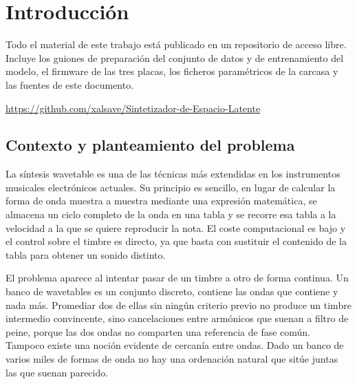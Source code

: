 \chapter{Introducción}

\noindent\begin{minipage}[c]{0.76\textwidth}
Todo el material de este trabajo está publicado en un repositorio de acceso
libre. Incluye los guiones de preparación del conjunto de datos y de
entrenamiento del modelo, el firmware de las tres placas, los ficheros
paramétricos de la carcasa y las fuentes de este documento.

\smallskip
\noindent\url{https://github.com/xalsave/Sintetizador-de-Espacio-Latente}
\end{minipage}\hfill
\begin{minipage}[c]{0.20\textwidth}
\centering
{}
\end{minipage}

\bigskip

\section{Contexto y planteamiento del problema}
\hypertarget{RE1.1}{}\label{RE1.1}

La síntesis wavetable es una de las técnicas más extendidas en los instrumentos
musicales electrónicos actuales. Su principio es sencillo, en lugar de calcular
la forma de onda muestra a muestra mediante una expresión matemática, se
almacena un ciclo completo de la onda en una tabla y se recorre esa tabla a la
velocidad a la que se quiere reproducir la nota. El coste
computacional es bajo y el control sobre el timbre es directo, ya que basta con
sustituir el contenido de la tabla para obtener un sonido distinto.

El problema aparece al intentar pasar de un timbre a otro de forma continua. Un
banco de wavetables es un conjunto discreto, contiene las ondas que contiene y
nada más. Promediar dos de ellas sin ningún criterio previo no produce un timbre
intermedio convincente, sino cancelaciones entre armónicos que suenan a filtro
de peine, porque las dos ondas no comparten una referencia de fase común.
Tampoco existe una noción evidente de cercanía entre ondas. Dado un banco de
varios miles de formas de onda no hay una ordenación natural que sitúe juntas
las que suenan parecido.

